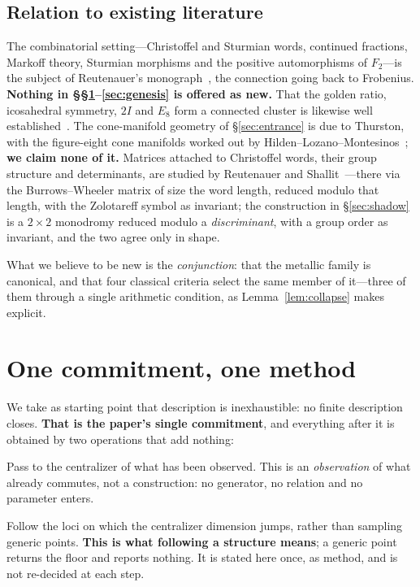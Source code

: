 \documentclass[11pt,reqno]{amsart}
\theoremstyle{plain}
\theoremstyle{definition}
\theoremstyle{remark}
\begin{document}
\subsection{Relation to existing literature}
The combinatorial setting---Christoffel and Sturmian words, continued fractions,
Markoff theory, Sturmian morphisms and the positive automorphisms of $F_2$---is the
subject of Reutenauer's monograph~\cite{Reutenauer}, the connection going back to
Frobenius. \textbf{Nothing in \S\S\ref{sec:price}--\ref{sec:genesis} is offered as
new.} That the golden ratio, icosahedral symmetry, $2I$ and $E_8$ form a connected
cluster is likewise well established~\cite{Baez,Dechant}. The cone-manifold geometry of
\S\ref{sec:entrance} is due to Thurston, with the figure-eight cone manifolds worked
out by Hilden--Lozano--Montesinos~\cite{HLM95}; \textbf{we claim none of it.} Matrices
attached to Christoffel words, their group structure and determinants, are studied by
Reutenauer and Shallit~\cite{ChristoffelMatrices}---there via the Burrows--Wheeler
matrix of size the word length, reduced modulo that length, with the Zolotareff symbol
as invariant; the construction in \S\ref{sec:shadow} is a $2\times2$ monodromy reduced
modulo a \emph{discriminant}, with a group order as invariant, and the two agree only
in shape.

What we believe to be new is the \emph{conjunction}: that the metallic family is
canonical, and that four classical criteria select the same member of it---three of
them through a single arithmetic condition, as Lemma~\ref{lem:collapse} makes explicit.

\section{One commitment, one method}\label{sec:price}

We take as starting point that description is inexhaustible: no finite description
closes. \textbf{That is the paper's single commitment}, and everything after it is
obtained by two operations that add nothing:

\begin{description}[leftmargin=1.9em,style=nextline,itemsep=2pt]
\item[\textnormal{\textbf{Measure.}}] Pass to the centralizer of what has been observed.
  This is an \emph{observation} of what already commutes, not a construction: no
  generator, no relation and no parameter enters.
\item[\textnormal{\textbf{Track.}}] Follow the loci on which the centralizer dimension
  jumps, rather than sampling generic points. \textbf{This is what following a structure
  means}; a generic point returns the floor and reports nothing. It is stated here once,
  as method, and is not re-decided at each step.
\end{description}
\end{document}
